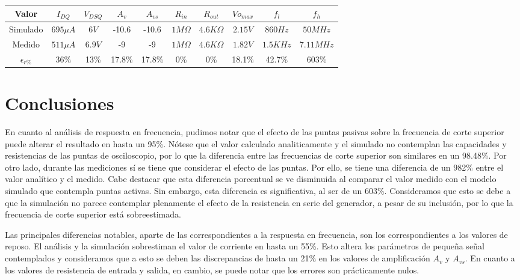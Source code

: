 \documentclass[a4paper, 10pt, spanish]{article}
\begin{document}
\begin{center}
  \begin{tabular}{|c|c|c|c|c|c|c|c|c|c|}
    \hline
    Valor & $I_{DQ}$ & $V_{DSQ}$ & $A_v$ & $A_{vs}$ & $R_{in}$ & $R_{out}$ & $V{o_{max}}$ & $f_l$ & $f_h$ \\
    \hline
    Simulado & $695\mu A$ & $6V$ & -10.6 & -10.6 & $1M\Omega$ & $4.6K\Omega$ & $2.15V$ & $860Hz$ & $50MHz$ \\
    \hline
    Medido & $511\mu A$ & $6.9V$ & -9 & -9 & $1M\Omega$ & $4.6K\Omega$ & $1.82V$ & $1.5KHz$ & $7.11MHz$ \\
    \hline
    $\epsilon_{r\%}$ & 36\% & 13\% & 17.8\% & 17.8\% & 0\% & 0\% & 18.1\% & 42.7\% & 603\% \\
    \hline
  \end{tabular}
  \label{tab:comparativo3}
\end{center}

\newpage

\section{Conclusiones}
	En cuanto al análisis de respuesta en frecuencia, pudimos notar que el efecto de las puntas pasivas sobre la frecuencia de corte superior puede alterar el resultado en hasta un 95\%. Nótese que el valor calculado analiticamente y el simulado no contemplan las capacidades y resistencias de las puntas de osciloscopio, por lo que la diferencia entre las frecuencias de corte superior son similares en un 98.48\%. Por otro lado, durante las mediciones sí se tiene que considerar el efecto de las puntas. Por ello, se tiene una diferencia de un 982\% entre el valor analítico y el medido. Cabe destacar que esta diferencia porcentual se ve disminuida al comparar el valor medido con el modelo simulado que contempla puntas activas. Sin embargo, esta diferencia es significativa, al ser de un 603\%. Consideramos que esto se debe a que la simulación no parece contemplar plenamente el efecto de la resistencia en serie del generador, a pesar de su inclusión, por lo que la frecuencia de corte superior está sobreestimada.

  Las principales diferencias notables, aparte de las correspondientes a la respuesta en frecuencia, son los correspondientes a los valores de reposo. El análisis y la simulación sobrestiman el valor de corriente en hasta un 55\%. Esto altera los parámetros de pequeña señal contemplados y consideramos que a esto se deben las discrepancias de hasta un 21\% en los valores de amplificación $A_v$ y $A_{vs}$. En cuanto a los valores de resistencia de entrada y salida, en cambio, se puede notar que los errores son prácticamente nulos.

\end{document}
